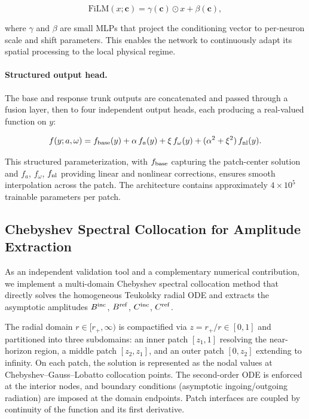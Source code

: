 \documentclass[aps,prd,twocolumn,superscriptaddress,nofootinbib]{revtex4-2}
\begin{document}
\begin{equation}
  \text{FiLM}(x; \mathbf{c}) = \gamma(\mathbf{c}) \odot x + \beta(\mathbf{c}),
\end{equation}

where $\gamma$ and $\beta$ are small MLPs that project the conditioning vector
to per-neuron scale and shift parameters.  This enables the network to
continuously adapt its spatial processing to the local physical regime.

\paragraph{Structured output head.} The base and response trunk outputs are
concatenated and passed through a fusion layer, then to four independent
output heads, each producing a real-valued function on $y$:

\begin{equation}
  f(y; a,\omega) = f_{\rm base}(y)
    + \alpha\, f_a(y)
    + \xi\, f_\omega(y)
    + (\alpha^2 + \xi^2)\, f_{\rm nl}(y).
  \label{eq:output_heads}
\end{equation}

This structured parameterization, with $f_{\rm base}$ capturing the patch-center
solution and $f_a$, $f_\omega$, $f_{\rm nl}$ providing linear and nonlinear
corrections, ensures smooth interpolation across the patch.  The architecture
contains approximately $4 \times 10^{5}$ trainable parameters per patch.

\subsection{Chebyshev Spectral Collocation for Amplitude Extraction}
\label{sec:spectral}

As an independent validation tool and a complementary numerical contribution,
we implement a multi-domain Chebyshev spectral collocation method that directly
solves the homogeneous Teukolsky radial ODE and extracts the asymptotic
amplitudes $B^{\rm inc}$, $B^{\rm ref}$, $C^{\rm inc}$, $C^{\rm ref}$.

The radial domain $r \in [r_+, \infty)$ is compactified via
$z = r_+/r \in [0,1]$ and partitioned into three subdomains:
an inner patch $[z_1, 1]$ resolving the near-horizon region, a middle patch
$[z_2, z_1]$, and an outer patch $[0, z_2]$ extending to infinity.
On each patch, the solution is represented as the nodal values at
Chebyshev--Gauss--Lobatto collocation points.  The second-order ODE is
enforced at the interior nodes, and boundary conditions (asymptotic
ingoing/outgoing radiation) are imposed at the domain endpoints.
Patch interfaces are coupled by continuity of the function and its first
derivative.
\end{document}
